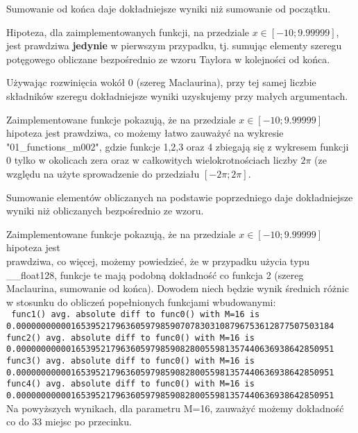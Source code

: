 \documentclass[12pt]{article}
\newenvironment{hypothesis}[2][Hipoteza]{\begin{trivlist}
\item[\hskip \labelsep {\bfseries #1}\hskip \labelsep {\bfseries #2.}]}{\end{trivlist}}
\begin{document}
\begin{hypothesis}{1}
Sumowanie od końca daje dokładniejsze wyniki niż sumowanie od początku.
\end{hypothesis}
Hipoteza, dla zaimplementowanych funkcji, na przedziale $x \in [-10; 9.99999]$, jest prawdziwa \textbf{jedynie} w pierwszym przypadku, tj. sumując elementy szeregu potęgowego obliczane bezpośrednio ze wzoru Taylora w kolejności od końca.

\begin{hypothesis}{2}
Używając rozwinięcia wokół 0 (szereg Maclaurina), przy tej samej liczbie składników szeregu dokładniejsze wyniki uzyskujemy przy małych argumentach.
\end{hypothesis}
Zaimplementowane funkcje pokazują, że na przedziale $x \in [-10; 9.99999]$ hipoteza jest prawdziwa, co możemy łatwo zauważyć na wykresie "01\_functions\_m002", gdzie funkcje 1,2,3 oraz 4 zbiegają się z wykresem funkcji 0 tylko w okolicach zera oraz w całkowitych wielokrotnościach liczby $2\pi$ (ze względu na użyte sprowadzenie do przedziału $[-2\pi;2\pi]$.

\begin{hypothesis}{3}
Sumowanie elementów obliczanych na podstawie poprzedniego daje dokładniejsze wyniki niż obliczanych bezpośrednio ze wzoru.
\end{hypothesis}
Zaimplementowane funkcje pokazują, że na przedziale $x \in [-10;9.99999]$ hipoteza jest \\prawdziwa, co więcej, możemy powiedzieć, że w przypadku użycia typu \_\_float128, funkcje te mają podobną dokładność co funkcja 2 (szereg Maclaurina, sumowanie od końca).
Dowodem niech będzie wynik średnich różnic w stosunku do obliczeń popełnionych funkcjami wbudowanymi:\\
\texttt{
func1() avg. absolute diff to func0() with M=16 is\\
0.0000000000016539521796360597985907078303108796753612877507503184\\
func2() avg. absolute diff to func0() with M=16 is\\
0.0000000000016539521796360597985908280055981357440636938642850951\\
func3() avg. absolute diff to func0() with M=16 is\\
0.0000000000016539521796360597985908280055981357440636938642850951\\
func4() avg. absolute diff to func0() with M=16 is\\
0.0000000000016539521796360597985908280055981357440636938642850951
}\\
Na powyższych wynikach, dla parametru M=16, zauważyć możemy dokładność co do 33 miejsc po przecinku.
\end{document}

